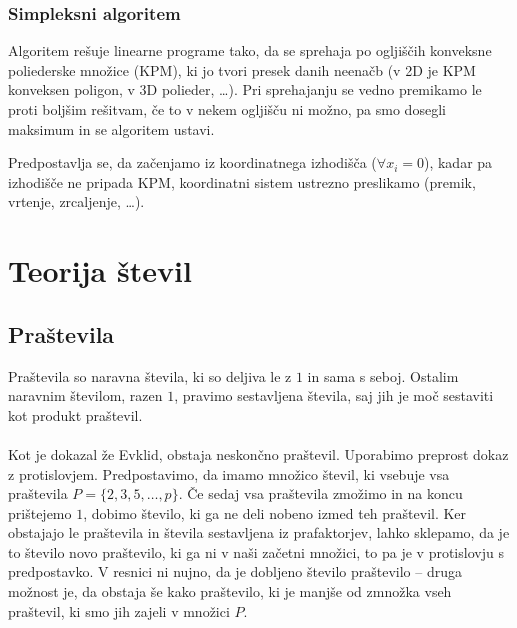 \documentclass[10pt,a4paper,oneside]{book}
\begin{document}
\subsection{Simpleksni algoritem}
Algoritem rešuje linearne programe tako, da se sprehaja po ogljiščih konveksne poliederske množice (KPM), ki jo tvori presek danih neenačb (v 2D je KPM konveksen poligon, v 3D polieder, \dots). Pri sprehajanju se vedno premikamo le proti boljšim rešitvam, če to v nekem ogljišču ni možno, pa smo dosegli maksimum in se algoritem ustavi.

Predpostavlja se, da začenjamo iz koordinatnega izhodišča ($\forall x_i = 0$), kadar pa izhodišče ne pripada KPM, koordinatni sistem ustrezno preslikamo (premik, vrtenje, zrcaljenje, \dots).


\chapter{Teorija števil}

\section{Praštevila}
Praštevila so naravna števila, ki so deljiva le z $1$ in sama s seboj. Ostalim naravnim številom, razen $1$, pravimo sestavljena števila, saj jih je moč sestaviti kot produkt praštevil.\\
\\
Kot je dokazal že Evklid\cite{elementi}, obstaja neskončno praštevil. Uporabimo preprost dokaz z protislovjem.
Predpostavimo, da imamo množico števil, ki vsebuje vsa praštevila $P = \{2,3,5,\dots,p\}$. Če sedaj vsa praštevila zmožimo in na koncu prištejemo $1$, dobimo število, ki ga ne deli nobeno izmed teh praštevil. Ker obstajajo le praštevila in števila sestavljena iz prafaktorjev, lahko sklepamo, da je to število novo praštevilo, ki ga ni v naši začetni množici, to pa je v protislovju s predpostavko. V resnici ni nujno, da je dobljeno število praštevilo -- druga možnost je, da obstaja še kako praštevilo, ki je manjše od zmnožka vseh praštevil, ki smo jih zajeli v množici $P$.\\
\end{document}
